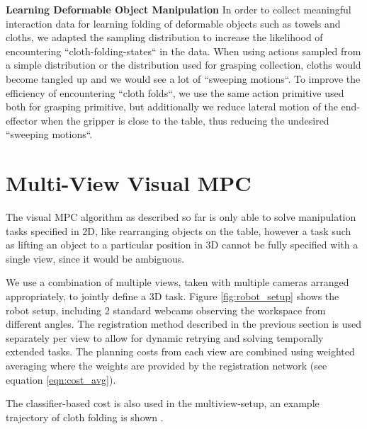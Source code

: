 \noindent \textbf{Learning Deformable Object Manipulation}
In order to collect meaningful interaction data for learning folding of deformable objects such as towels and cloths, we adapted the sampling distribution to increase the likelihood of encountering ``cloth-folding-states`` in the data. When using actions sampled from a simple distribution or the distribution used for grasping collection, cloths would become tangled up and we would see a lot of ``sweeping motions``. To improve the efficiency of encountering ``cloth folds``, we use the same action primitive used both for grasping primitive, but additionally we reduce lateral motion of the end-effector when the gripper is close to the table, thus reducing the undesired ``sweeping motions``.

\section{Multi-View Visual MPC}
\label{sec:multiview}
The visual MPC algorithm as described so far is only able to solve manipulation tasks specified in 2D, like rearranging objects on the table, however a task such as lifting an object to a particular position in 3D cannot be fully specified with a single view, since it would be ambiguous. 

We use a combination of multiple views, taken with multiple cameras arranged appropriately, to jointly define a 3D task. Figure \ref{fig:robot_setup} shows the robot setup, including 2 standard webcams observing the workspace from different angles. The registration method described in the previous section is used separately per view to allow for dynamic retrying and solving temporally extended tasks. The planning costs from each view are combined using weighted averaging where the weights are provided by the registration network (see equation \ref{eqn:cost_avg}).  

The classifier-based cost is also used in the multiview-setup, an example trajectory of cloth folding is shown . 





